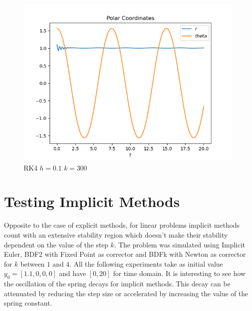 \documentclass{scrartcl}
\newcounter{constant}
\begin{document}
\begin{figure}[h]
\centering
\begin{minipage}[b]{0.45\textwidth}
\centering
\includegraphics[width=\textwidth]{../Plots/RK4/rk4_h=0.1_k=300_c}
\caption{RK4 $h=0.1$ $k=300$}
\label{rk4_h=0.1_k=300_c}
\end{minipage}
\end{figure}

\section*{Testing Implicit Methods}

Opposite to the case of explicit methods, for linear problems implicit methods count with an extensive stability region which doesn’t make their stability dependent on the value of the step $k$.
The problem was simulated using Implicit Euler, BDF2 with Fixed Point as corrector and BDFk with Newton as corrector for $k$ between $1$ and $4$. All the following experiments take as initial value $y_0 = [1.1, 0, 0, 0]$ and have $[0, 20]$ for time domain.
It is interesting to see how the oscillation of the spring decays for implicit methods. This decay can be attenuated by reducing the step size or accelerated by increasing the value of the spring constant.
\end{document}
